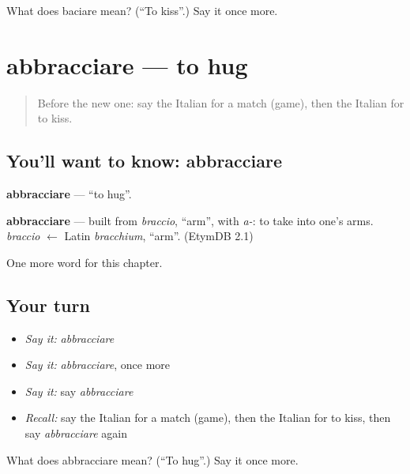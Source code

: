 \begin{tcolorbox}[breakable,colback=teal!4,colframe=teal!35!black,title={Before you move on}]
What does baciare mean? (\textquotedblleft{}To kiss\textquotedblright{}.) Say it once more.
\end{tcolorbox}
\section[abbracciare]{abbracciare — to hug}

\label{lesson:IT-C174-abbracciare}



\begin{quote}
Before the new one: say the Italian for a match (game), then the Italian for to kiss.
\end{quote}

\subsection*{You'll want to know: abbracciare}
\textbf{abbracciare} — \textquotedblleft{}to hug\textquotedblright{}.

\begin{cousinweb}
\textbf{abbracciare} — built from \emph{braccio}, \textquotedblleft{}arm\textquotedblright{}, with \emph{a-}: to take into one's arms. \emph{braccio} $\leftarrow$ Latin \emph{bracchium}, \textquotedblleft{}arm\textquotedblright{}. (EtymDB 2.1)
\end{cousinweb}

\begin{grammarlens}[title={What you've built}]
One more word for this chapter.
\end{grammarlens}

\subsection*{Your turn}
\begin{itemize}
\raggedright
  \item \emph{Say it:} \emph{abbracciare}
  \item \emph{Say it:} \emph{abbracciare}, once more
  \item \emph{Say it:} say \emph{abbracciare}
  \item \emph{Recall:} say the Italian for a match (game), then the Italian for to kiss, then say \emph{abbracciare} again
\end{itemize}

\begin{tcolorbox}[breakable,colback=teal!4,colframe=teal!35!black,title={Before you move on}]
What does abbracciare mean? (\textquotedblleft{}To hug\textquotedblright{}.) Say it once more.
\end{tcolorbox}
